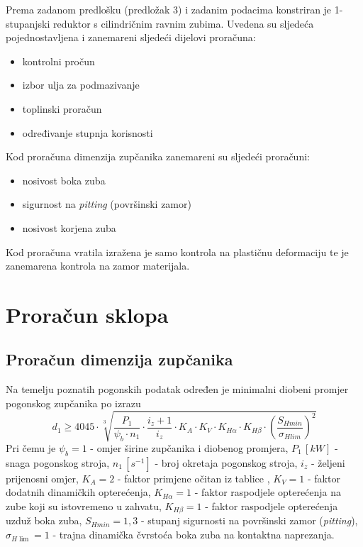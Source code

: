 \documentclass[11pt,a4paper]{report}
\begin{document}
Prema zadanom predlošku (predložak 3) i zadanim podacima konstriran je 1-stupanjski reduktor s cilindričnim ravnim zubima.
Uvedena su sljedeća pojednostavljena i zanemareni sljedeći dijelovi proračuna:
\begin{itemize}
\item kontrolni pročun
\item izbor ulja za podmazivanje
\item toplinski proračun
\item određivanje stupnja korisnosti
\end{itemize}
Kod proračuna dimenzija zupčanika zanemareni su sljedeći proračuni:
\begin{itemize}
\item nosivost boka zuba
\item sigurnost na \textit{pitting} (površinski zamor)
\item nosivost korjena zuba
\end{itemize}
Kod proračuna vratila izražena je samo kontrola na plastičnu deformaciju te je zanemarena kontrola na zamor materijala.

\chapter{Proračun sklopa}
\section{Proračun dimenzija zupčanika}
Na temelju poznatih pogonskih podatak određen je minimalni diobeni promjer pogonskog zupčanika po izrazu
\begin{equation}
d_1\geq 4045 \cdot \sqrt[3]{\frac{P_1}{\psi_b \cdot n_1} \cdot \frac{i_z +1}{i_z}\cdot K_A \cdot 
K_V \cdot K_{H\alpha} \cdot K_{H\beta} \cdot \left(\frac{S_{Hmin}}{\sigma_{Hlim}}\right)^2 }\label{equ:d1minimalno}
\end{equation}
Pri čemu je $\psi_b=1$ - omjer širine zupčanika i diobenog promjera,
$P_1 \, [kW]$ - snaga pogonskog stroja,
$n_1 \, [s^{-1}]$ - broj okretaja pogonskog stroja,
$i_z$ - željeni prijenosni omjer,
$K_A=2$ - faktor primjene očitan iz tablice \cite{potrebniMaterijali},
$K_V=1$ - faktor dodatnih dinamičkih opterećenja,
$K_{H\alpha}=1$ - faktor raspodjele opterećenja na zube koji su istovremeno u zahvatu,
$K_{H\beta}=1$ - faktor raspodjele opterećenja uzduž boka zuba,
$S_{Hmin}=1,3$ - stupanj sigurnosti na površinski zamor (\textit{pitting}),
$\sigma_{H\lim}=1$ - trajna dinamička čvrstoća boka zuba na kontaktna naprezanja.
\end{document}
